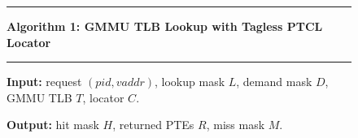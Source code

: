 
\begin{figure}[t]
\centering
\begin{minipage}{0.98\columnwidth}
\footnotesize
\hrule
\vspace{0.35em}
\noindent\textbf{Algorithm 1: GMMU TLB Lookup with Tagless PTCL Locator}
\vspace{0.25em}
\hrule
\vspace{0.45em}

\noindent\textbf{Input:} request $(pid, vaddr)$, lookup mask $L$, demand mask $D$,
GMMU TLB $T$, locator $C$.

\noindent\textbf{Output:} hit mask $H$, returned PTEs $R$, miss mask $M$.


\end{minipage}
\end{figure}
